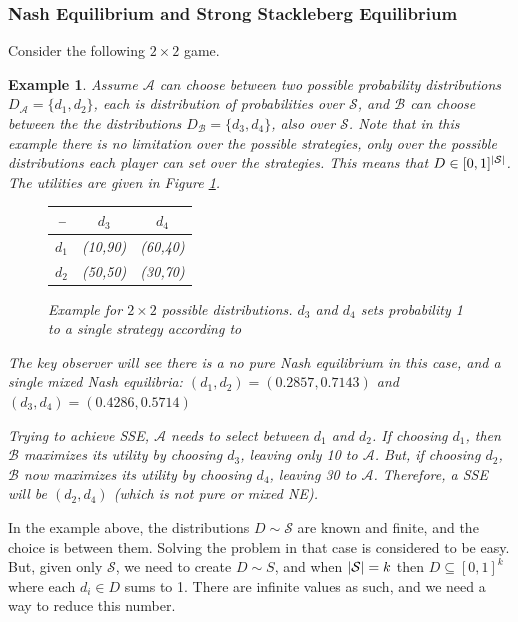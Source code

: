 \documentclass[a4paper,10pt]{article}
\newtheorem{Example}{Example}[section]
\newcommand{\A}{\ensuremath{\mathcal{A}}\xspace}
\newcommand{\B}{\ensuremath{\mathcal{B}}\xspace}
\DeclarePairedDelimiter\abs{\lvert}{\rvert}%
\begin{document}
\subsubsection{Nash Equilibrium and Strong Stackleberg Equilibrium}
Consider the following $2\times 2$ game.
\begin{Example}
Assume \A can choose between two possible probability distributions $D_{\A}=\{d_1,d_2\}$, each is distribution of probabilities over $\mathcal{S}$, and \B can choose between the the distributions $D_{\B}= \{d_3,d_4\}$, also over $\mathcal{S}$. Note that in this example there is no limitation over the possible strategies, only over the possible distributions each player can set over the strategies. This means that $D\in[0,1]^{\abs*{\mathcal{S}}}$.
The utilities are given in Figure \ref{tables: example SSE 2X2}.
\begin{figure} 
\centering
\begin{tabular}{|c|c|c|} 
  -- & $d_3$ & $d_4$\\
  \hline $d_1$ & (10,90) & (60,40)\\
  \hline $d_2$ & (50,50) & (30,70)\\
\end{tabular}
\caption{Example for $2 \times 2$ possible distributions. $d_3$ and $d_4$ sets probability 1 to a single strategy according to \crbs[\mathcal{S}][d_{1/2}]} \label{tables: example SSE 2X2}
\end{figure}


The key observer will see there is a no pure Nash equilibrium in this case, and a single mixed Nash equilibria: $(d_1, d_2) = (0.2857,0.7143)$ and $(d_3, d_4) = (0.4286,0.5714)$

Trying to achieve SSE, \A needs to select between $d_1$ and $d_2$. If choosing $d_1$, then \B maximizes its utility by choosing $d_3$, leaving only 10 to \A. But, if choosing $d_2$, \B now maximizes its utility by choosing $d_4$, leaving 30 to \A. Therefore, a SSE will be $(d_2,d_4)$ (which is not pure or mixed NE).

\end{Example}

In the example above, the distributions $D\sim \mathcal{S}$ are known and finite, and the choice is between them. Solving the problem in that case is considered to be easy.
But, given only $\mathcal{S}$, we need to create $D \sim S$, and when $\abs*{\mathcal{S}}=k$ then $D\subseteq[0,1]^{k}$ where each $d_i\in D$ sums to 1. There are infinite values as such, and we need a way to reduce this number.
\end{document}
